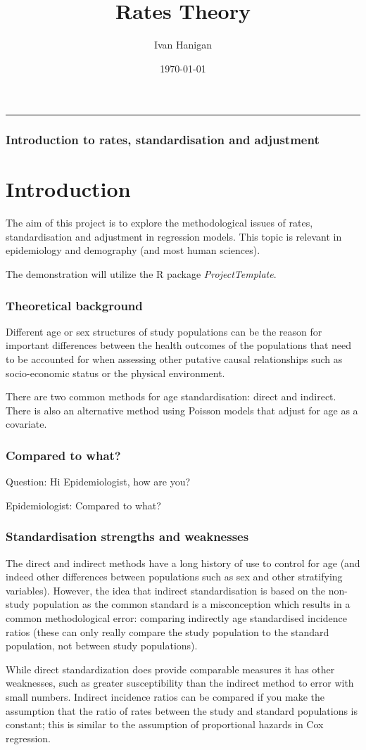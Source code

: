 \documentclass[a4paper]{beamer}
\title{Rates Theory}
\author{Ivan Hanigan}
\date{\today}
\begin{document}
\maketitle

\hrule


\begin{frame}
\frametitle{Introduction to rates, standardisation and adjustment}
\label{sec-1}

\section{Introduction}
The aim of this project is to explore the methodological issues of rates, standardisation and adjustment in regression models.
This topic is relevant in epidemiology and demography (and most human sciences).

The demonstration will utilize the R package \emph{ProjectTemplate}.
\end{frame}
\begin{frame}
\frametitle{Theoretical background}
\label{sec-2}

Different age or sex structures of study populations can be the reason for important differences between the health outcomes of the populations that need to be accounted for when assessing other putative causal relationships such as socio-economic status or the physical environment. 

There are two common methods for age standardisation: direct and indirect. There is also an alternative method using Poisson models that adjust for age as a covariate.
\end{frame}
\begin{frame}
\frametitle{Compared to what?}
\label{sec-3}

Question: Hi Epidemiologist, how are you?

Epidemiologist: Compared to what?
\end{frame}
\begin{frame}
\frametitle{Standardisation strengths and weaknesses}
\label{sec-4}

The direct and indirect methods have a long history of use to control for age (and indeed other differences between populations such as sex and other stratifying variables).  However, the idea that indirect standardisation is based on the non-study population as the common standard is a misconception which results in a common methodological error: comparing indirectly age standardised incidence ratios (these can only really compare the study population to the standard population, not between study populations). 

While direct standardization does provide comparable measures it has other weaknesses, such as greater susceptibility than the indirect method to error with small numbers. Indirect incidence ratios can be compared if you make the assumption that the ratio of rates between the study and standard populations is constant; this is similar to the assumption of proportional hazards in Cox regression. 
\end{frame}
\end{document}
